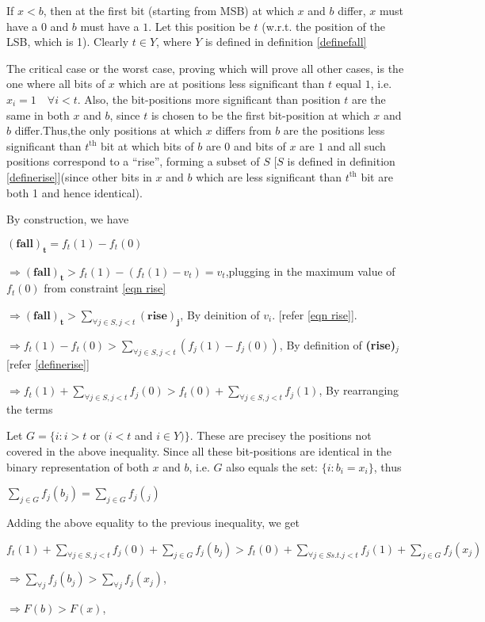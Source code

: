 \documentclass[11pt, letterpaper, romanappendices, onecolumn]{article}
\theoremstyle{plain}\newtheorem{thm}{Theorem}[section]
\theoremstyle{definition}
\theoremstyle{remark}
\begin{document}
\par If $x < b$, then at the first bit (starting from MSB) at which $x$ and $b$ differ, $x$ must have a $0$ and $b$ must have a $1$. Let this position be $t$ (w.r.t. the position of the LSB, which is 1). Clearly $t\in Y$, where $Y$ is defined in definition \ref{definefall} 

\par The critical case or the worst case, proving which will prove all other cases, is the one where all bits of $x$ which are at positions less significant than $t$ equal $1$, i.e. $x_i=1 \quad \forall i<t$. Also, the bit-positions more significant than position $t$ are the same in both $x$ and $b$, since $t$ is chosen to be the first bit-position at which $x$ and $b$ differ.Thus,the only positions at which $x$ differs from $b$ are the positions less significant than $t^\text{th}$ bit at which bits of $b$ are $0$ and bits of $x$ are $1$ and all such positions correspond to a ``rise'', forming a subset of $S$ [$S$ is defined in definition \ref{definerise}](since other bits in $x$ and $b$ which are less significant than $t^\text{th}$ bit are both 1 and hence identical).

\par By construction, we have
\begin{flushleft}

$\mathbf{(fall)_t}=f_t(1)-f_t(0)$

$\Longrightarrow\mathbf{(fall)_t}> f_t(1)-(f_t(1)-v_t)=v_t $,\quad plugging in the maximum value of $f_t(0)$ from constraint \ref{eqn rise}

$\Longrightarrow\mathbf{(fall)_t}> \sum\limits^{}_{\forall j \in S, j<t}\mathbf{(rise)_j}$, \quad By deinition of $v_i$. [refer \ref{eqn rise}].

$\Longrightarrow f_t(1) - f_t (0) > \sum\limits^{}_{\forall j \in S, j<t} (f_j(1) - f_j(0))$, \quad By definition of \textbf{(rise)$_j$} [refer \ref{definerise}]

$\Longrightarrow f_t(1) + \sum\limits^{}_{\forall j \in S, j<t} f_j(0) > f_t(0) + \sum\limits^{}_{\forall j \in S, j<t} f_j(1)$, \quad By rearranging the terms

\par Let $G=\{i: i>t$ or $(i<t$ and $i\in Y)\}$. These are precisey the positions not covered in the above inequality. Since all these bit-positions are identical in the binary representation of both $x$ and $b$, i.e. $G$ also equals the set: $\{i:b_i=x_i\}$, thus

$	\sum\limits^{}_{j\in G}f_j(b_j)=\sum\limits^{}_{j\in G}f_j(_j)$


Adding the above equality to the previous inequality, we get

$f_t(1) + \sum\limits^{}_{\forall j \in S, j<t} f_j(0)+\sum\limits^{}_{j\in G}f_j(b_j) > f_t(0) + \sum\limits^{}_{\forall j \in S s.t.j<t} f_j(1) + \sum\limits^{}_{j\in G}f_j(x_j)$

$\Longrightarrow \sum\limits_{\forall j}f_j(b_j) > \sum\limits_{\forall j}f_j(x_j)$, 

$\Longrightarrow F(b) > F(x)$, 

\end{flushleft}
\end{document}
